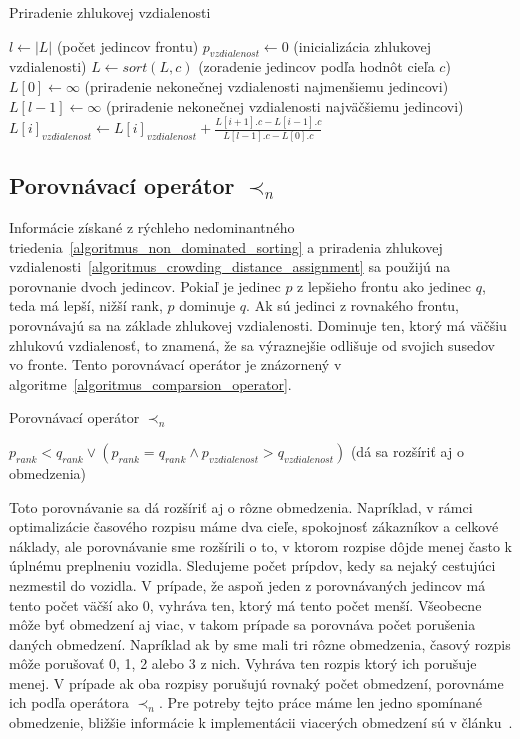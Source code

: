 \vspace*{\dimexpr0.5\baselineskip\relax}
\begin{algorithm}[h]\label{algoritmus_crowding_distance_assignment}
\caption{Priradenie zhlukovej vzdialenosti}
  $l \gets |L|$ (počet jedincov frontu)\;
   {
    $p_{vzdialenost} \gets 0$ (inicializácia zhlukovej vzdialenosti)\;
  }
   {
    $L \gets sort(L, c)$ (zoradenie jedincov podľa hodnôt cieľa $c$)\;
    $L[0] \gets \infty$ (priradenie nekonečnej vzdialenosti najmenšiemu jedincovi)\;
    $L[l-1] \gets \infty$ (priradenie nekonečnej vzdialenosti najväčšiemu jedincovi)\;
     {
      $L[i]_{vzdialenost} \gets L[i]_{vzdialenost} + \frac{L[i+1].c - L[i-1].c}{L[l-1].c - L[0].c}$\;
    }
  }
\end{algorithm}

\subsection*{Porovnávací operátor $\prec_n$}
Informácie získané z rýchleho nedominantného triedenia~\ref{algoritmus_non_dominated_sorting} a priradenia zhlukovej vzdialenosti~\ref{algoritmus_crowding_distance_assignment} sa použijú na porovnanie dvoch jedincov.
Pokiaľ je jedinec $p$ z lepšieho frontu ako jedinec $q$, teda má lepší, nižší rank, $p$ dominuje $q$.
Ak sú jedinci z rovnakého frontu, porovnávajú sa na základe zhlukovej vzdialenosti.
Dominuje ten, ktorý má väčšiu zhlukovú vzdialenosť, to znamená, že sa výraznejšie odlišuje od svojich susedov vo fronte.
Tento porovnávací operátor je znázornený v algoritme~\ref{algoritmus_comparsion_operator}.

\vspace*{\dimexpr0.5\baselineskip\relax}
\begin{algorithm}[h]\label{algoritmus_comparsion_operator}
\caption{Porovnávací operátor $\prec_n$}
  \Return $p_{rank} < q_{rank} \vee (p_{rank} = q_{rank} \wedge p_{vzdialenost} > q_{vzdialenost})$\;
  (dá sa rozšíriť aj o obmedzenia)\;
\end{algorithm}

Toto porovnávanie sa dá rozšíriť aj o rôzne obmedzenia.
Napríklad, v rámci optimalizácie časového rozpisu máme dva cieľe, spokojnosť zákazníkov a celkové náklady, ale porovnávanie sme rozšírili o to, v ktorom rozpise dôjde menej často k úplnému preplneniu vozidla.
Sledujeme počet prípdov, kedy sa nejaký cestujúci nezmestil do vozidla.
V prípade, že aspoň jeden z porovnávaných jedincov má tento počet väčší ako 0, vyhráva ten, ktorý má tento počet menší.
Všeobecne môže byť obmedzení aj viac, v takom prípade sa porovnáva počet porušenia daných obmedzení.
Napríklad ak by sme mali tri rôzne obmedzenia, časový rozpis môže porušovať 0, 1, 2 alebo 3 z nich.
Vyhráva ten rozpis ktorý ich porušuje menej.
V prípade ak oba rozpisy porušujú rovnaký počet obmedzení, porovnáme ich podľa operátora $\prec_n$.
Pre potreby tejto práce máme len jedno spomínané obmedzenie, bližšie informácie k implementácii viacerých obmedzení sú v článku~\cite{deb2002nsga}.

